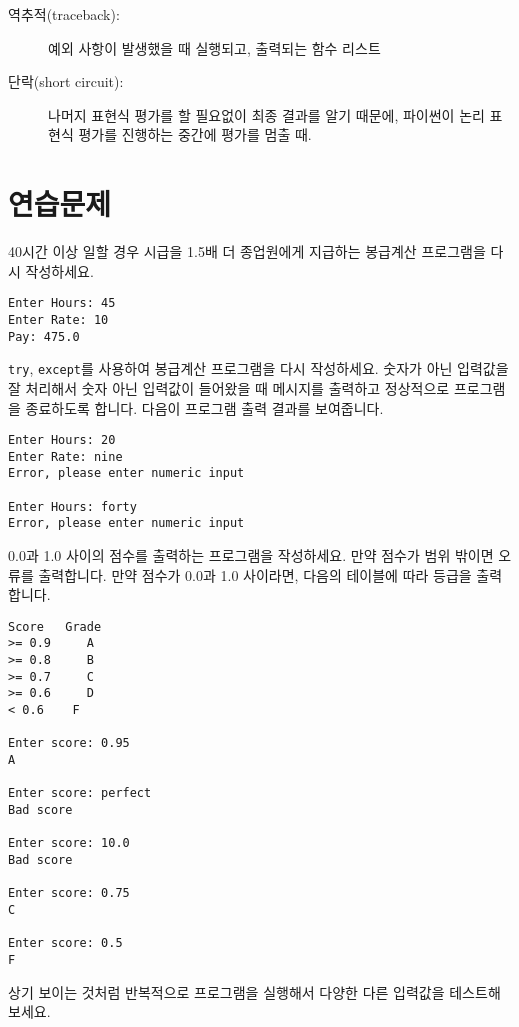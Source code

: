 \begin{description}
\item[역추적(traceback):] 예외 사항이 발생했을 때 실행되고, 출력되는 함수 리스트

\item[단락(short circuit):] 나머지 표현식 평가를 할 필요없이 최종 결과를 알기 때문에,
파이썬이 논리 표현식 평가를 진행하는 중간에 평가를 멈출 때.

\end{description}

\section{연습문제}

\begin{ex}
40시간 이상 일할 경우 시급을 1.5배 더 종업원에게 지급하는 봉급계산 프로그램을 다시 작성하세요.

\begin{verbatim}
Enter Hours: 45
Enter Rate: 10
Pay: 475.0
\end{verbatim}
\end{ex}

\begin{ex}
{\tt try}, {\tt except}를 사용하여 봉급계산 프로그램을 다시 작성하세요.
숫자가 아닌 입력값을 잘 처리해서 숫자 아닌 입력값이 들어왔을 때 메시지를 출력하고 정상적으로 프로그램을 종료하도록 합니다.
다음이 프로그램 출력 결과를 보여줍니다.

\begin{verbatim}
Enter Hours: 20
Enter Rate: nine
Error, please enter numeric input

Enter Hours: forty
Error, please enter numeric input
\end{verbatim}
\end{ex}

\begin{ex}
0.0과 1.0 사이의 점수를 출력하는 프로그램을 작성하세요.
만약 점수가 범위 밖이면 오류를 출력합니다. 
만약 점수가 0.0과 1.0 사이라면, 다음의 테이블에 따라 등급을 출력합니다.

\begin{verbatim}
Score   Grade
>= 0.9     A
>= 0.8     B
>= 0.7     C
>= 0.6     D
< 0.6    F

Enter score: 0.95
A

Enter score: perfect
Bad score

Enter score: 10.0
Bad score

Enter score: 0.75
C

Enter score: 0.5
F
\end{verbatim}
상기 보이는 것처럼 반복적으로 프로그램을 실행해서 다양한 다른 입력값을 테스트해 보세요.
\end{ex}

